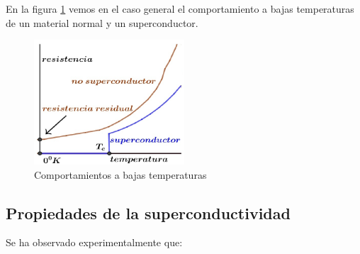 En la figura \ref{fig:45} vemos en el caso general el comportamiento a bajas temperaturas de un material normal y un superconductor.

\begin{figure}[H]
    \centering
    \includegraphics[width=0.5\textwidth]{./Figures/fig45}
	\caption{Comportamientos a bajas temperaturas}
	\label{fig:45}
\end{figure}
	



\subsection{Propiedades de la superconductividad}

Se ha observado experimentalmente que:

